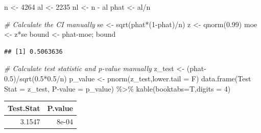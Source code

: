 \documentclass[
  11pt,
]{book}
\newenvironment{Shaded}{\begin{snugshade}}{\end{snugshade}}
\newcommand{\AttributeTok}[1]{\textcolor[rgb]{0.77,0.63,0.00}{#1}}
\newcommand{\CommentTok}[1]{\textcolor[rgb]{0.56,0.35,0.01}{\textit{#1}}}
\newcommand{\DecValTok}[1]{\textcolor[rgb]{0.00,0.00,0.81}{#1}}
\newcommand{\FloatTok}[1]{\textcolor[rgb]{0.00,0.00,0.81}{#1}}
\newcommand{\FunctionTok}[1]{\textcolor[rgb]{0.00,0.00,0.00}{#1}}
\newcommand{\NormalTok}[1]{#1}
\newcommand{\OtherTok}[1]{\textcolor[rgb]{0.56,0.35,0.01}{#1}}
\newcommand{\SpecialCharTok}[1]{\textcolor[rgb]{0.00,0.00,0.00}{#1}}
\newcommand{\StringTok}[1]{\textcolor[rgb]{0.31,0.60,0.02}{#1}}
\theoremstyle{definition}
\theoremstyle{definition}
\theoremstyle{definition}
\theoremstyle{definition}
\theoremstyle{remark}
\begin{document}
\vfill

\newpage

\begin{Shaded}
\begin{Highlighting}[]
\NormalTok{n }\OtherTok{\textless{}{-}} \DecValTok{4264}
\NormalTok{al }\OtherTok{\textless{}{-}} \DecValTok{2235}
\NormalTok{nl }\OtherTok{\textless{}{-}}\NormalTok{ n }\SpecialCharTok{{-}}\NormalTok{ al}
\NormalTok{phat }\OtherTok{\textless{}{-}}\NormalTok{ al}\SpecialCharTok{/}\NormalTok{n}

\CommentTok{\# Calculate the CI manually}
\NormalTok{se }\OtherTok{\textless{}{-}} \FunctionTok{sqrt}\NormalTok{(phat}\SpecialCharTok{*}\NormalTok{(}\DecValTok{1}\SpecialCharTok{{-}}\NormalTok{phat)}\SpecialCharTok{/}\NormalTok{n)}
\NormalTok{z }\OtherTok{\textless{}{-}} \FunctionTok{qnorm}\NormalTok{(}\FloatTok{0.99}\NormalTok{)}
\NormalTok{moe }\OtherTok{\textless{}{-}}\NormalTok{ z}\SpecialCharTok{*}\NormalTok{se}
\NormalTok{bound }\OtherTok{\textless{}{-}}\NormalTok{ phat}\SpecialCharTok{{-}}\NormalTok{moe; bound}
\end{Highlighting}
\end{Shaded}

\begin{verbatim}
## [1] 0.5063636
\end{verbatim}

\begin{Shaded}
\begin{Highlighting}[]
\CommentTok{\# Calculate test statistic and p{-}value manually}
\NormalTok{z\_test }\OtherTok{\textless{}{-}}\NormalTok{ (phat}\FloatTok{{-}0.5}\NormalTok{)}\SpecialCharTok{/}\FunctionTok{sqrt}\NormalTok{(}\FloatTok{0.5}\SpecialCharTok{*}\FloatTok{0.5}\SpecialCharTok{/}\NormalTok{n)}
\NormalTok{p\_value }\OtherTok{\textless{}{-}} \FunctionTok{pnorm}\NormalTok{(z\_test,}\AttributeTok{lower.tail =}\NormalTok{ F)}
\FunctionTok{data.frame}\NormalTok{(}\StringTok{\textasciigrave{}}\AttributeTok{Test Stat}\StringTok{\textasciigrave{}} \OtherTok{=}\NormalTok{ z\_test, }\StringTok{\textasciigrave{}}\AttributeTok{P{-}value}\StringTok{\textasciigrave{}} \OtherTok{=}\NormalTok{ p\_value)  }\SpecialCharTok{\%\textgreater{}\%} 
  \FunctionTok{kable}\NormalTok{(}\AttributeTok{booktabs=}\NormalTok{T,}\AttributeTok{digits =} \DecValTok{4}\NormalTok{)}
\end{Highlighting}
\end{Shaded}

\begin{tabular}{rr}
\toprule
Test.Stat & P.value\\
\midrule
3.1547 & 8e-04\\
\bottomrule
\end{tabular}
\end{document}
